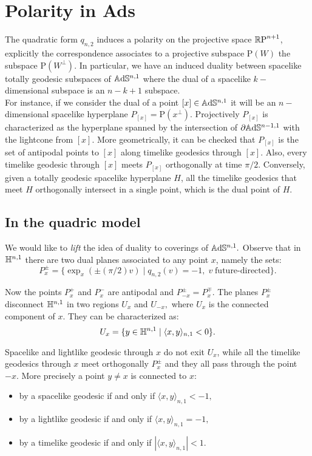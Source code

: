 \section{Polarity in Ads}\label{polarsec}
The quadratic form $q_{n,2}$ induces a polarity on the projective space $\mathbb{R}\text{P}^{n+1}$, explicitly the correspondence associates to a projective subspace $\text{P}(W)$ the subspace $\text{P}(W^\perp)$. In particular, we have an induced duality between spacelike totally geodesic subspaces of $\mathbb{A}\mathrm{d}\mathbb{S}^{n,1}$ where the dual of a spacelike $k-$dimensional subspace is an $n-k+1$ subspace. \\
For instance, if we consider the dual of a point $[x]\in\mathbb{A}\mathrm{d}\mathbb{S}^{n,1}$ it will be an $n-$dimensional spacelike hyperplane $P_{[x]}=\text{P}(x^\perp).$ Projectively $P_{[x]}$ is characterized as the hyperplane spanned by the intersection of $\partial\mathbb{A}\mathrm{d}\mathbb{S}^{n-1,1}$ with the lightcone from $[x]$. More geometrically, it can be checked that $P_{[x]}$ is the set of antipodal points to $[x]$ along timelike geodesics through $[x].$ Also, every timelike geodesic through $[x]$ meets $P_{[x]}$ orthogonally at time $\pi/2.$ Conversely, given a totally geodesic spacelike hyperplane $H$, all the timelike geodesics that meet $H$ orthogonally intersect in a single point, which is the dual point of $H$. 

\subsection*{In the quadric model} We would like to \textit{lift} the idea of duality to coverings of $\mathbb{A}\mathrm{d}\mathbb{S}^{n,1}.$ Observe that in $\mathbb{H}^{n,1}$ there are two dual planes associated to any point $x$, namely the sets: 
\[
    P_x^\pm=\{\exp_x(\pm(\pi/2)v)\;|\;q_{n,2}(v)=-1,\; v\;\text{future-directed}\}.
\] 

Now the points $P_x^+$ and $P_x^-$ are antipodal and $P_{-x}^\pm=P_x^\mp$. The planes $P_x^\pm$ disconnect $\mathbb{H}^{n,1}$ in two regions $U_x$ and $U_{-x},$ where $U_x$ is the connected component of $x$. They can be characterized as: 
\[
    U_x=\{y\in\mathbb{H}^{n,1}\;|\;\langle x,y\rangle_{n,1}<0\}.
\]

Spacelike and lightlike geodesic through $x$ do not exit $U_x$, while all the timelike geodesics through $x$ meet orthogonally $P_x^\pm$ and they all pass through the point $-x$. More precisely a point $y\neq x$ is connected to $x$: 
\begin{itemize}
    \item by a spacelike geodesic if and only if $\langle x,y\rangle_{n,1}<-1,$
    \item by a lightlike geodesic if and only if $\langle x,y\rangle_{n,1}=-1,$
    \item by a timelike geodesic if and only if $|\langle x,y\rangle_{n,1}|<1.$ 
\end{itemize}

